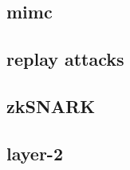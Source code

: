 \documentclass[../../thesis.tex]{subfiles}
\begin{document}
\subsection{mimc}
\subsection{replay attacks}
\subsection{zkSNARK}
\subsection{layer-2}


\end{document}
